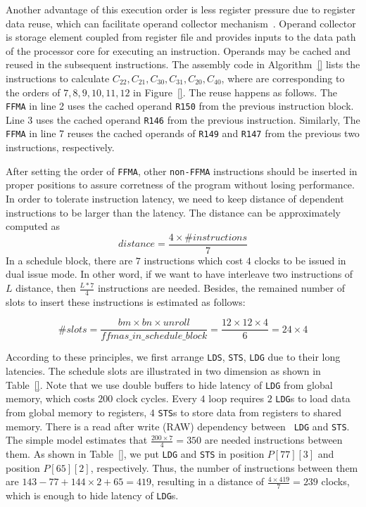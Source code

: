 \documentclass{sig-alternate-05-2015}
\begin{document}
Another advantage of this execution order is less register pressure due to register data reuse, which can facilitate operand collector mechanism~\cite{}. Operand collector is storage element coupled from register file and provides inputs to the data path of the processor core for executing an instruction. Operands may be cached and reused in the subsequent instructions. The assembly code in Algorithm~\ref{} lists the instructions to calculate $C_{22}, C_{21}, C_{30}, C_{31}, C_{20}, C_{40}$, where are corresponding to the orders of $7,8,9,10,11,12$ in Figure~\ref{}. The reuse happens as follows. The {\tt FFMA} in line 2 uses the cached operand {\tt R150} from the previous instruction block. Line 3 uses the cached operand {\tt R146} from the previous instruction. Similarly, The {\tt FFMA} in line 7 reuses the cached operands of   {\tt R149} and {\tt R147} from the previous two instructions, respectively.


After setting the order of {\tt FFMA}, other {\tt non-FFMA} instructions should be inserted in proper positions to assure
corretness of the program without losing performance. In order to tolerate instruction latency, we need to keep distance of dependent instructions to be larger than the latency. The distance can be approximately computed as
\begin{displaymath}
distance = \frac{4\times\#instructions}{7}
\end{displaymath}
In a schedule block, there are $7$ instructions which cost $4$ clocks to be issued in dual issue mode. In other word, if we want to have interleave
two instructions of $L$ distance, then $\frac{L*7}{4}$ instructions are needed. Besides, the remained number of slots to insert these instructions is estimated as follows:

\begin{displaymath}
\#slots = \frac{bm\times bn\times unroll}{ffmas\_in\_schedule\_block}=\frac{12\times 12\times 4}{6}=24\times 4
\end{displaymath}

According to these principles, we first arrange {\tt LDS}, {\tt STS}, {\tt LDG} due to their long latencies. The schedule slots are illustrated in two dimension as shown in Table~\ref{}.
Note that we use double buffers to hide latency of {\tt LDG} from global memory, which costs $200$ clock cycles.
Every $4$ loop requires $2$ {\tt LDG}s to load data from global memory to registers, $4$ {\tt STS}s to store data from registers to shared memory. There is a read after write (RAW) dependency between {\tt
LDG} and {\tt STS}. The simple model estimates that $\frac{200\times 7}{4} = 350$ are needed instructions between them. As shown in Table~\ref{}, we put {\tt LDG} and  {\tt STS} in position $P[77][3]$ and position $P[65][2]$, respectively. Thus, the number of instructions between them are $143-77 + 144\times 2 +
65=419$, resulting in a distance of $\frac{4\times 419}{7}=239$ clocks, which is enough to hide latency of {\tt LDG}s.
\end{document}
